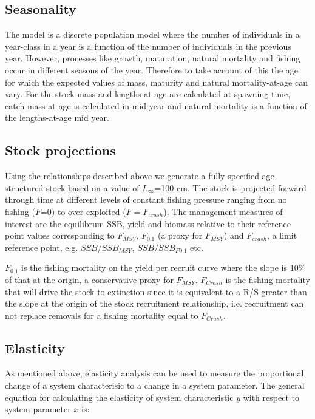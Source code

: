 \documentclass{pnastwo}
\begin{document}
\begin{article}
\begin{description}
\end{description}

\subsection{Seasonality}

The model is a discrete population model where the number of individuals in a year-class in a year is a function of the number of individuals in the previous year.
However, processes like growth, maturation, natural mortality and fishing occur in different seasons of the year. Therefore to take account of this the age for which
the expected values of mass, maturity and natural mortality-at-age can vary.
For the stock mass and lengths-at-age are calculated at spawning time, catch mass-at-age is calculated in mid year and natural mortality is a function of the lengths-at-age 
mid year.  

\subsection{Stock projections}
Using the relationships described above we generate a fully specified age-structured stock based on a value of $L_{\infty}$=100 cm. The stock is projected
forward through time at different levels of constant fishing pressure ranging from no fishing ($F$=0) to over exploited ($F=F_{crash}$).
The management measures of interest are the equilibrum SSB, yield and biomass relative to their reference point values corresponding to
$F_{MSY}$, $F_{0.1}$ (a proxy for $F_{MSY}$) and $F_{crash}$, a limit reference point, e.g. $SSB / SSB_{MSY}$, $SSB / SSB_{F0.1}$ etc.

$F_{0.1}$ is the fishing mortality on the yield per recruit curve where the slope is 10\%  of that at the origin, a conservative proxy for $F_{MSY}$.
$F_{Crash}$ is the fishing mortality that will drive the stock to extinction since it is equivalent to a R/S greater than the slope at the origin of
the stock recruitment relationship, i.e. recruitment can not replace removals for a fishing mortality equal to $F_{Crash}$.  

\subsection{Elasticity}
As mentioned above, elasticity analysis can be used to measure the proportional change of a system characterisic to a change in a system parameter. 
The general equation for calculating the elasticity of system characteristic $y$ with respect to system parameter $x$ is:


\end{article}
\end{document}
